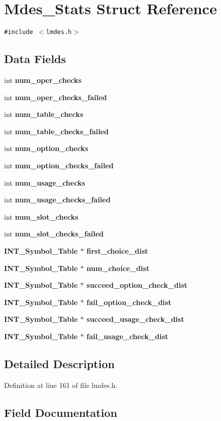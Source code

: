 \section{Mdes\_\-Stats Struct Reference}
\label{structMdes__Stats}
{\tt \#include $<$lmdes.h$>$}

\subsection*{Data Fields}
\begin{CompactItemize}
\item 
int \bf{num\_\-oper\_\-checks}
\item 
int \bf{num\_\-oper\_\-checks\_\-failed}
\item 
int \bf{num\_\-table\_\-checks}
\item 
int \bf{num\_\-table\_\-checks\_\-failed}
\item 
int \bf{num\_\-option\_\-checks}
\item 
int \bf{num\_\-option\_\-checks\_\-failed}
\item 
int \bf{num\_\-usage\_\-checks}
\item 
int \bf{num\_\-usage\_\-checks\_\-failed}
\item 
int \bf{num\_\-slot\_\-checks}
\item 
int \bf{num\_\-slot\_\-checks\_\-failed}
\item 
\bf{INT\_\-Symbol\_\-Table} $\ast$ \bf{first\_\-choice\_\-dist}
\item 
\bf{INT\_\-Symbol\_\-Table} $\ast$ \bf{num\_\-choice\_\-dist}
\item 
\bf{INT\_\-Symbol\_\-Table} $\ast$ \bf{succeed\_\-option\_\-check\_\-dist}
\item 
\bf{INT\_\-Symbol\_\-Table} $\ast$ \bf{fail\_\-option\_\-check\_\-dist}
\item 
\bf{INT\_\-Symbol\_\-Table} $\ast$ \bf{succeed\_\-usage\_\-check\_\-dist}
\item 
\bf{INT\_\-Symbol\_\-Table} $\ast$ \bf{fail\_\-usage\_\-check\_\-dist}
\end{CompactItemize}


\subsection{Detailed Description}




Definition at line 161 of file lmdes.h.

\subsection{Field Documentation}
